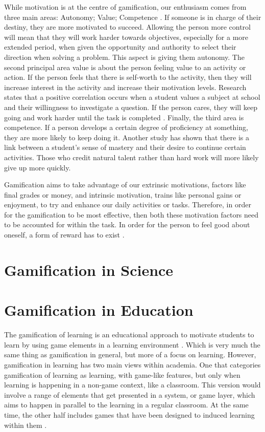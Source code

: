 		While motivation is at the centre of gamification, our enthusiasm comes from three main areas: Autonomy; Value; Competence \cite{keepmotivation}. If someone is in charge of their destiny, they are more motivated to succeed. Allowing the person more control will mean that they will work harder towards objectives, especially for a more extended period, when given the opportunity and authority to select their direction when solving a problem. This aspect is giving them autonomy. The second principal area value is about the person feeling value to an activity or action. If the person feels that there is self-worth to the activity, then they will increase interest in the activity and increase their motivation levels. Research states that a positive correlation occurs when a student values a subject at school and their willingness to investigate a question. If the person cares, they will keep going and work harder until the task is completed \cite{gamescience, keepmotivation}. Finally, the third area is competence. If a person develops a certain degree of proficiency at something, they are more likely to keep doing it. Another study has shown that there is a link between a student’s sense of mastery and their desire to continue certain activities. Those who credit natural talent rather than hard work will more likely give up more quickly.
		
		Gamification aims to take advantage of our extrinsic motivations, factors like final grades or money, and intrinsic motivation, trains like personal gains or enjoyment, to try and enhance our daily activities or tasks. Therefore, in order for the gamification to be most effective, then both these motivation factors need to be accounted for within the task. In order for the person to feel good about oneself, a form of reward has to exist \cite{gamescience}.
			
	\section{Gamification in Science}
		\label{sec:resources_bibtex}
	
		
	\section{Gamification in Education}
		\label{sec:gamification_edu}
		The gamification of learning is an educational approach to motivate students to learn by using game elements in a learning environment \cite{gamelearning}. Which is very much the same thing as gamification in general, but more of a focus on learning. However, gamification in learning has two main views within academia. One that categories gamification of learning as learning, with game-like features, but only when learning is happening in a non-game context, like a classroom. This version would involve a range of elements that get presented in a system, or game layer, which aims to happen in parallel to the learning in a regular classroom. At the same time, the other half includes games that have been designed to induced learning within them \cite{gamelearning}.

